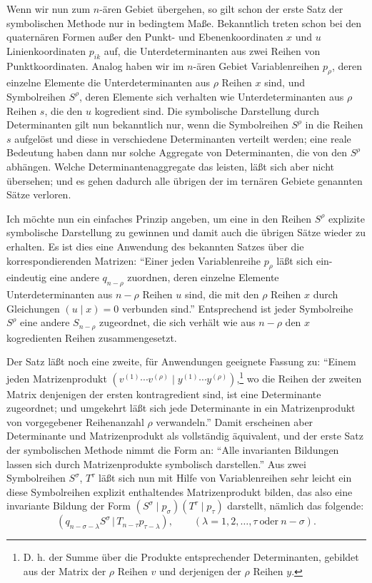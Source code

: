 \documentclass[11pt]{article}
\providecommand{\pair}[2]{(#1\,|\,#2)}
\begin{document}
Wenn wir nun zum $n$-ären Gebiet übergehen, so gilt schon der erste Satz der symbolischen Methode nur in bedingtem Maße. Bekanntlich treten schon bei den quaternären Formen außer den Punkt- und Ebenenkoordinaten $x$ und $u$ Linienkoordinaten $p_{ik}$ auf, die Unterdeterminanten aus zwei Reihen von Punktkoordinaten. Analog haben wir im $n$-ären Gebiet Variablenreihen $p_\rho$, deren einzelne Elemente die Unterdeterminanten aus $\rho$ Reihen $x$ sind, und Symbolreihen $S^\rho$, deren Elemente sich verhalten wie Unterdeterminanten aus $\rho$ Reihen $s$, die den $u$ kogredient sind. Die symbolische Darstellung durch Determinanten gilt nun bekanntlich nur, wenn die Symbolreihen $S^\rho$ in die Reihen $s$ aufgelöst und diese in verschiedene Determinanten verteilt werden; eine reale Bedeutung haben dann nur solche Aggregate von Determinanten, die von den $S^\rho$ abhängen. Welche Determinantenaggregate das leisten, läßt sich aber nicht übersehen; und es gehen dadurch alle übrigen der im ternären Gebiete genannten Sätze verloren.

Ich möchte nun ein einfaches Prinzip angeben, um eine in den Reihen $S^\rho$ explizite symbolische Darstellung zu gewinnen und damit auch die übrigen Sätze wieder zu erhalten. Es ist dies eine Anwendung des bekannten Satzes über die korrespondierenden Matrizen: ``Einer jeden Variablenreihe $p_\rho$ läßt sich ein-eindeutig eine andere $q_{n-\rho}$ zuordnen, deren einzelne Elemente Unterdeterminanten aus $n-\rho$ Reihen $u$ sind, die mit den $\rho$ Reihen $x$ durch Gleichungen $(u\mid x)=0$ verbunden sind.'' Entsprechend ist jeder Symbolreihe $S^\rho$ eine andere $S_{n-\rho}$ zugeordnet, die sich verhält wie aus $n-\rho$ den $x$ kogredienten Reihen zusammengesetzt.

Der Satz läßt noch eine zweite, für Anwendungen geeignete Fassung zu: ``Einem jeden Matrizenprodukt $(v^{(1)}\cdots v^{(\rho)}\mid y^{(1)}\cdots y^{(\rho)})$,\footnote{D. h. der Summe über die Produkte entsprechender Determinanten, gebildet aus der Matrix der $\rho$ Reihen $v$ und derjenigen der $\rho$ Reihen $y$.} wo die Reihen der zweiten Matrix denjenigen der ersten kontragredient sind, ist eine Determinante zugeordnet; und umgekehrt läßt sich jede Determinante in ein Matrizenprodukt von vorgegebener Reihenanzahl $\rho$ verwandeln.'' Damit erscheinen aber Determinante und Matrizenprodukt als vollständig äquivalent, und der erste Satz der symbolischen Methode nimmt die Form an: ``Alle invarianten Bildungen lassen sich durch Matrizenprodukte symbolisch darstellen.'' Aus zwei Symbolreihen $S^\sigma$, $T^\tau$ läßt sich nun mit Hilfe von Variablenreihen sehr leicht ein diese Symbolreihen explizit enthaltendes Matrizenprodukt bilden, das also eine invariante Bildung der Form $(S^\sigma\mid p_\sigma)(T^\tau\mid p_\tau)$ darstellt, nämlich das folgende:
\begin{equation}
 \pair{q_{n-\sigma-\lambda}S^\sigma}{T_{n-\tau}p_{\tau-\lambda}},
 \qquad (\lambda=1,2,\ldots,\tau\ \text{oder}\ n-\sigma).
\tag{1}
\end{equation}
\end{document}
